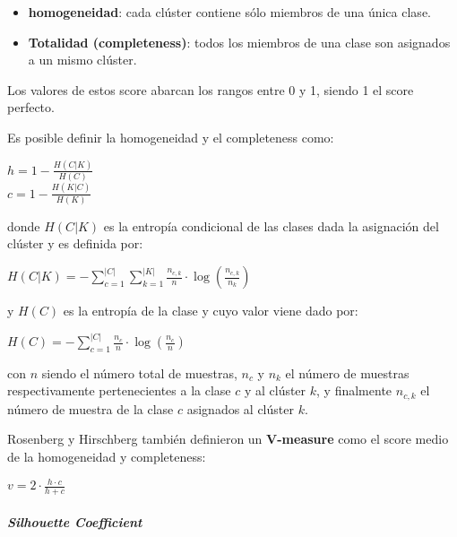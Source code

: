 \begin{itemize}
	
	\item \textbf{homogeneidad}: cada clúster contiene sólo miembros de una única clase.
	
	\item \textbf{Totalidad (completeness)}: todos los miembros de una clase son asignados a un mismo clúster.
	
\end{itemize}

Los valores de estos score abarcan los rangos entre 0 y 1, siendo 1 el score perfecto.

Es posible definir la homogeneidad y el completeness como:

\begin{center}
	
	$h = 1 - \frac{H(C|K)}{H(C)}$\\
	$c = 1 - \frac{H(K|C)}{H(K)}$
\end{center}

donde $H(C|K)$ es la entropía condicional de las clases dada la asignación del clúster y es definida por:

\begin{center}
	
	$H(C|K) = - \sum_{c=1}^{|C|} \sum_{k=1}^{|K|} \frac{n_{c,k}}{n} \cdot \log(\frac{n_{c,k}}{n_k})$
	
\end{center}

y $H(C)$ es la entropía de la clase y cuyo valor viene dado por:

\begin{center}
	
	$H(C) = - \sum_{c=1}^{|C|} \frac{n_c}{n} \cdot \log(\frac{n_c}{n})$
\end{center}

con $n$ siendo el número total de muestras, $n_c$ y $n_k$ el número de muestras respectivamente pertenecientes a la clase $c$ y al clúster $k$, y finalmente $n_{c,k}$ el número de muestra de la clase $c$ asignados al clúster $k$.

Rosenberg y Hirschberg también definieron un \textbf{V-measure} como el score medio de la homogeneidad y completeness:

\begin{center}
	
	$v = 2 \cdot \frac{h \cdot c}{h + c}$
\end{center}
\subparagraph{Silhouette Coefficient\\\\}

